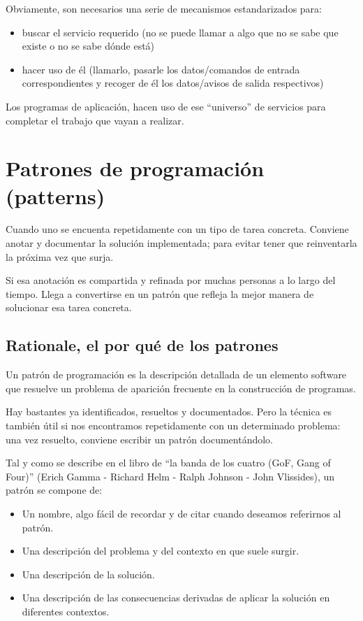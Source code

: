\documentclass[spanish,12pt,a4paper,final,oneside]{book}
\begin{document}
Obviamente, son necesarios una serie de mecanismos estandarizados para:
\begin{itemize}
\item buscar el servicio requerido (no se puede llamar a algo que no se sabe que existe o no se sabe dónde está) 
\item hacer uso de él (llamarlo, pasarle los datos/comandos de entrada correspondientes y recoger de él los datos/avisos de salida respectivos)
\end{itemize}

Los programas de aplicación, hacen uso de ese ``universo'' de servicios para completar el trabajo que vayan a realizar.




\section{Patrones de programación (patterns)}

Cuando uno se encuenta repetidamente con un tipo de tarea concreta. Conviene anotar y documentar la solución implementada; para evitar tener que reinventarla la próxima vez que surja.

Si esa anotación es compartida y refinada por muchas personas a lo largo del tiempo. Llega a convertirse en un patrón que refleja la mejor manera de solucionar esa tarea concreta.


\subsection{Rationale, el por qué de los patrones}
Un patrón de programación es la descripción detallada de un elemento software que resuelve un problema de  aparición frecuente en la construcción de programas. 

Hay bastantes ya identificados, resueltos y documentados. Pero la técnica es también útil si nos encontramos repetidamente con un determinado problema: una vez resuelto, conviene escribir un patrón documentándolo.

Tal y como se describe en el libro de ``la banda de los cuatro (GoF, Gang of Four)'' (Erich Gamma - Richard Helm - Ralph Johnson - John Vlissides), un patrón se compone de:
\begin{itemize}
\item Un nombre, algo fácil de recordar y de citar cuando deseamos referirnos al patrón.
\item Una descripción del problema y del contexto en que suele surgir.
\item Una descripción de la solución.
\item Una descripción de las consecuencias derivadas de aplicar la solución en diferentes contextos.
\end{itemize}
\end{document}

